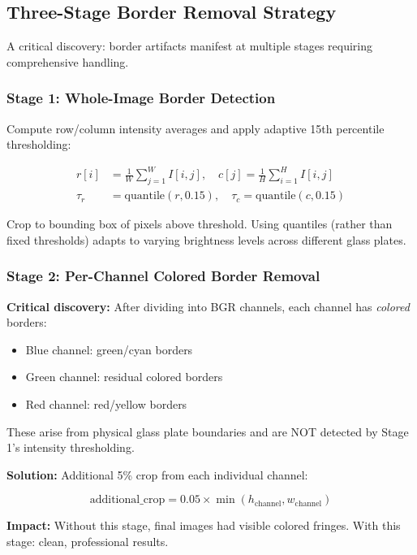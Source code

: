 {\subsection{Three-Stage Border Removal Strategy}

A critical discovery: border artifacts manifest at multiple stages requiring comprehensive handling.

\subsubsection{Stage 1: Whole-Image Border Detection}

Compute row/column intensity averages and apply adaptive 15th percentile thresholding:

\begin{align}
r[i] &= \frac{1}{W}\sum_{j=1}^{W} I[i,j], \quad c[j] = \frac{1}{H}\sum_{i=1}^{H} I[i,j] \\
\tau_r &= \text{quantile}(r, 0.15), \quad \tau_c = \text{quantile}(c, 0.15)
\end{align}

Crop to bounding box of pixels above threshold. Using quantiles (rather than fixed thresholds) adapts to varying brightness levels across different glass plates.

\subsubsection{Stage 2: Per-Channel Colored Border Removal}

\textbf{Critical discovery:} After dividing into BGR channels, each channel has \emph{colored} borders:
\begin{itemize}
\item Blue channel: green/cyan borders
\item Green channel: residual colored borders
\item Red channel: red/yellow borders
\end{itemize}

These arise from physical glass plate boundaries and are NOT detected by Stage 1's intensity thresholding.

\textbf{Solution:} Additional 5\% crop from each individual channel:

\begin{equation}
\text{additional\_crop} = 0.05 \times \min(h_{\text{channel}}, w_{\text{channel}})
\end{equation}

\textbf{Impact:} Without this stage, final images had visible colored fringes. With this stage: clean, professional results.

}
